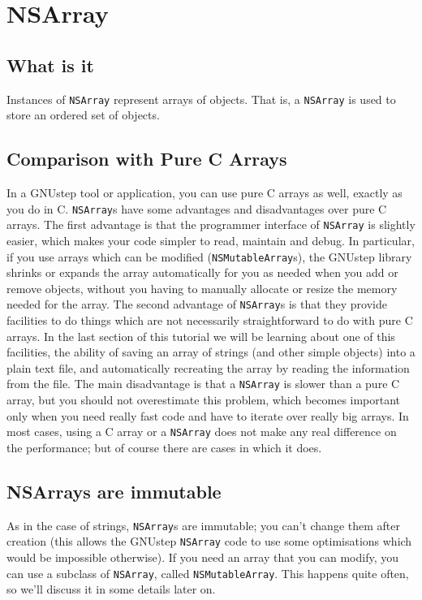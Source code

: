 \documentclass[a4paper]{article}
\begin{document}
\section{NSArray}
\subsection{What is it}
Instances of \texttt{NSArray} represent arrays of objects. 
That is, a \texttt{NSArray} is used to store an ordered set 
of objects.

\subsection{Comparison with Pure C Arrays}
In a GNUstep tool or application, you can use pure C arrays as well,
exactly as you do in C.  \texttt{NSArray}s have some advantages and
disadvantages over pure C arrays.  The first advantage is that the
programmer interface of \texttt{NSArray} is slightly easier, which
makes your code simpler to read, maintain and debug.  In particular,
if you use arrays which can be modified (\texttt{NSMutableArray}s),
the GNUstep library shrinks or expands the array automatically for you
as needed when you add or remove objects, without you having to
manually allocate or resize the memory needed for the array.  The
second advantage of \texttt{NSArray}s is that they provide facilities
to do things which are not necessarily straightforward to do with pure
C arrays.  In the last section of this tutorial we will be learning
about one of this facilities, the ability of saving an array of
strings (and other simple objects) into a plain text file, and
automatically recreating the array by reading the information from the
file.  The main disadvantage is that a \texttt{NSArray} is slower than a
pure C array, but you should not overestimate this problem, which
becomes important only when you need really fast code and have to
iterate over really big arrays.  In most cases, using a C array or a
\texttt{NSArray} does not make any real difference on the performance;
but of course there are cases in which it does.

\subsection{NSArrays are immutable}
As in the case of strings, \texttt{NSArray}s are immutable; you can't 
change them after creation (this allows the GNUstep \texttt{NSArray} 
code to use some optimisations which would be impossible otherwise).  
If you need an array that you can modify, you can use a subclass
of \texttt{NSArray}, called \texttt{NSMutableArray}.  This happens 
quite often, so we'll discuss it in some details later on. 
\end{document}
